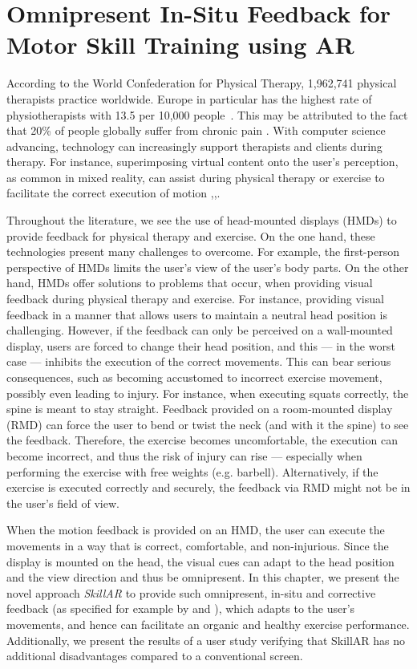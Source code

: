 \chapter{Omnipresent In-Situ Feedback for Motor Skill Training using AR \label{chap:omnipresent}}
According to the World Confederation for Physical Therapy, 1,962,741 physical therapists practice worldwide. Europe in particular has the highest rate of physiotherapists with 13.5 per 10,000 people~\cite{worldphysiotherapy2023global}. This may be attributed to the fact that 20\% of people globally suffer from chronic pain \cite{treede2015classification}. With computer science advancing, technology can increasingly support therapists and clients during therapy. For instance, superimposing virtual content onto the user's perception, as common in mixed reality, can assist during physical therapy or exercise to facilitate the correct execution of motion \cite{brepohl2023virtual},\cite{campo2021immersive},\cite{diller2022vcb}.

Throughout the literature, we see the use of head-mounted displays (HMDs) to provide feedback for physical therapy and exercise. On the one hand, these technologies present many challenges to overcome. For example, the first-person perspective of HMDs limits the user’s view of the user's body parts. On the other hand, HMDs offer solutions to problems that occur, when providing visual feedback during physical therapy and exercise. For instance, providing visual feedback in a manner that allows users to maintain a neutral head position is challenging. However, if the feedback can only be perceived on a wall-mounted display, users are forced to change their head position, and this --- in the worst case --- inhibits the execution of the correct movements. This can bear serious consequences, such as becoming accustomed to incorrect exercise movement, possibly even leading to injury. For instance, when executing squats correctly, the spine is meant to stay straight. Feedback provided on a room-mounted display (RMD) can force the user to bend or twist the neck (and with it the spine) to see the feedback. Therefore, the exercise becomes uncomfortable, the execution can become incorrect, and thus the risk of injury can rise --- especially when performing the exercise with free weights (e.g. barbell). Alternatively, if the exercise is executed correctly and securely, the feedback via RMD might not be in the user's field of view.

When the motion feedback is provided on an HMD, the user can execute the movements in a way that is correct, comfortable, and non-injurious. Since the display is mounted on the head, the visual cues can adapt to the head position and the view direction and thus be omnipresent. In this chapter, we present the novel approach \emph{SkillAR} to provide such omnipresent, in-situ and corrective feedback (as specified for example by \cite{hattie:2007:Feedback} and \cite{Lysakowski:1982:Feedback}), which adapts to the user's movements, and hence can facilitate an organic and healthy exercise performance. Additionally, we present the results of a user study verifying that SkillAR has no additional disadvantages compared to a conventional screen.

